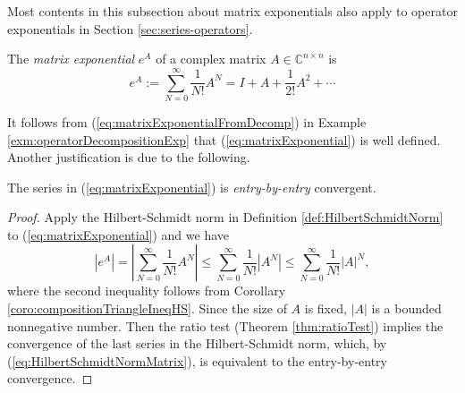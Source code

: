 \begin{rem}
  Most contents in this subsection %
  about matrix exponentials
  also apply to operator exponentials in Section \ref{sec:series-operators}.
\end{rem}

\begin{defn}
  \label{def:matrixExponential}
  The \emph{matrix exponential} $e^{A}$
  of a complex matrix $A\in \mathbb{C}^{n\times n}$ is 
  \begin{equation}
    \label{eq:matrixExponential}
    e^{A} 
    := \sum_{N=0}^{\infty}\frac{1}{N!}A^N
    = I + A + \frac{1}{2!}A^2 + \cdots
  \end{equation}
\end{defn}

\begin{rem}
  It follows from (\ref{eq:matrixExponentialFromDecomp})
  in Example \ref{exm:operatorDecompositionExp} that
  (\ref{eq:matrixExponential}) is well defined.
  Another justification is due to the following. 
\end{rem}

\begin{lem}
  \label{lem:expMatConverges}
  The series in (\ref{eq:matrixExponential}) is 
  \emph{entry-by-entry} convergent.
\end{lem}
\begin{proof}
  Apply the Hilbert-Schmidt norm
  in Definition \ref{def:HilbertSchmidtNorm}
  to (\ref{eq:matrixExponential})
  and we have
  \begin{displaymath}
    \left|e^{A}\right|
    = \left|\sum_{N=0}^{\infty}\frac{1}{N!}A^N\right|
    \le \sum_{N=0}^{\infty}\frac{1}{N!}\left|A^N\right|
    \le \sum_{N=0}^{\infty}\frac{1}{N!}\left|A\right|^N,
  \end{displaymath}
  where the second inequality follows from Corollary
  \ref{coro:compositionTriangleIneqHS}. 
  Since the size of $A$ is fixed,
  $|A|$ is a bounded nonnegative number.
  Then the ratio test (Theorem \ref{thm:ratioTest}) implies
   the convergence of the last series in the Hilbert-Schmidt norm,
   which,
   by (\ref{eq:HilbertSchmidtNormMatrix}), %
   is equivalent to
   the entry-by-entry convergence.
\end{proof}

